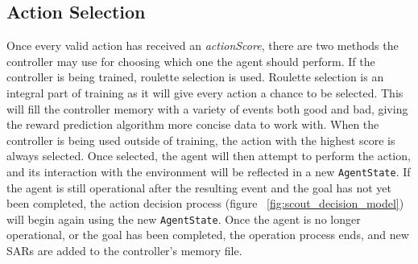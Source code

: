 \subsection{Action Selection}
Once every valid action has received an \textit{actionScore}, there are two methods the controller may use for choosing which one the agent should perform.
If the controller is being trained, roulette selection is used.
Roulette selection is an integral part of training as it will give every action a chance to be selected.
This will fill the controller memory with a variety of events both good and bad, giving the reward prediction algorithm more concise data to work with.
When the controller is being used outside of training, the action with the highest score is always selected.
Once selected, the agent will then attempt to perform the action, and its interaction with the environment will be reflected in a new \texttt{AgentState}.
If the agent is still operational after the resulting event and the goal has not yet been completed, the action decision process (figure ~\ref{fig:scout_decision_model}) will begin again using the new \texttt{AgentState}.
Once the agent is no longer operational, or the goal has been completed, the operation process ends, and new SARs are added to the controller's memory file.










